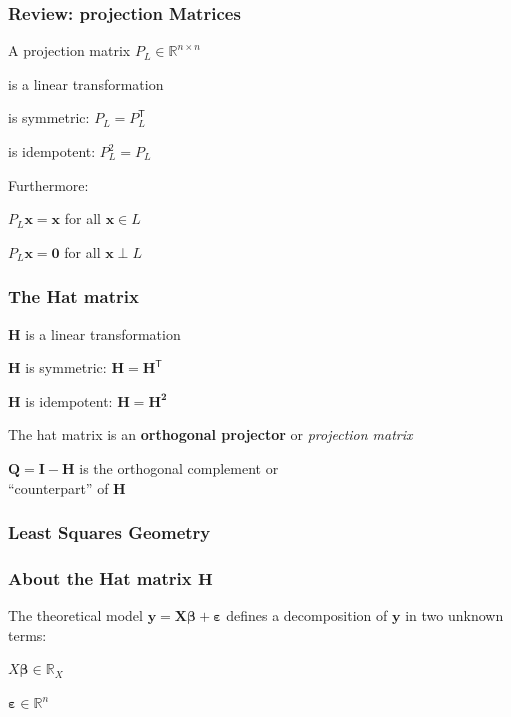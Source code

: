 \documentclass[12pt]{beamer}\usepackage[]{graphicx}\usepackage[]{color}
\begin{document}

\begin{frame}
\frametitle{Review: projection Matrices}

A projection matrix $P_L \in \mathbb{R}^{n \times n}$
\bi
  \item is a linear transformation
  \item is symmetric: $P_L = P^{\mathsf{T}}_{L}$
  \item is idempotent: $P_{L}^{2} = P_L$
  \item Furthermore:
  \bi
    \item $P_L \mathbf{x} = \mathbf{x}$ for all $\mathbf{x} \in L$
    \item $P_L \mathbf{x} = \mathbf{0}$ for all $\mathbf{x} \perp L$
  \ei
\ei

\end{frame}


\begin{frame}
\frametitle{The Hat matrix}

\bi
  \item $\mathbf{H}$ is a linear transformation
  \item $\mathbf{H}$ is symmetric: $\mathbf{H = H^{\mathsf{T}}}$
  \item $\mathbf{H}$ is idempotent: $\mathbf{H = H^2}$
  \item The hat matrix is an \textbf{orthogonal projector} or \textit{projection matrix}
  \item $\mathbf{Q = I - H}$ is the orthogonal complement or \\
  ``counterpart'' of $\mathbf{H}$
\ei

\end{frame}


\begin{frame}
\frametitle{Least Squares Geometry}
\begin{center}
\end{center}
\end{frame}


\begin{frame}
\frametitle{About the Hat matrix $\mathbf{H}$}

The theoretical model $\mathbf{y = X \boldsymbol{\beta}} + \boldsymbol{\varepsilon}$
defines a decomposition of $\mathbf{y}$ in two unknown terms:
\bbi
  \item $X \boldsymbol{\beta} \in \mathbb{R}_X$
  \item $\boldsymbol{\varepsilon} \in \mathbb{R}^n$
\ei

\end{frame}
\end{document}
